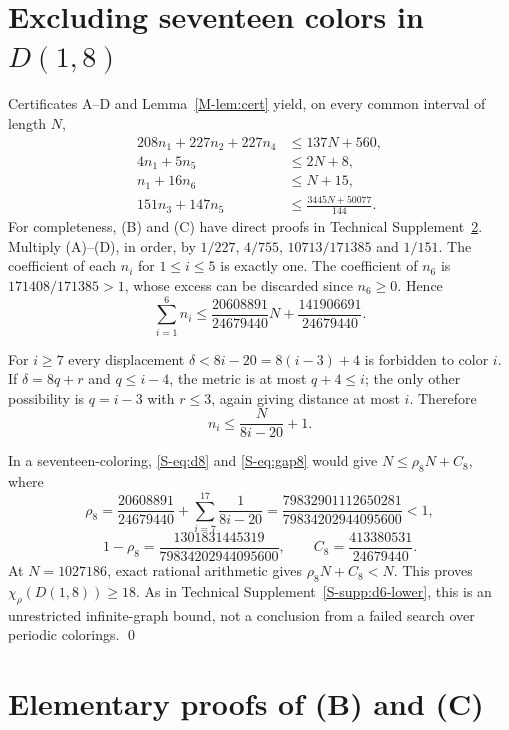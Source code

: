 \documentclass[11pt,reqno]{amsart}
\theoremstyle{plain}
\newcommand{\D}[1]{D(1,#1)}
\newcommand{\chirho}{\chi_{\rho}}
\theoremstyle{plain}
\theoremstyle{plain}
\begin{document}
\section{Excluding seventeen colors in \texorpdfstring{$\D{8}$}{D(1,8)}}\label{S-supp:d8-lower}

Certificates A--D and Lemma~\ref*{M-lem:cert} yield, on every common interval of
length $N$,
\begin{align}
208 n_1 + 227 n_2 + 227 n_4 &\le 137 N + 560, \tag{A}\\
4 n_1 + 5 n_5 &\le 2N + 8, \tag{B}\\
n_1 + 16 n_6 &\le N + 15, \tag{C}\\
151 n_3 + 147 n_5 &\le \tfrac{3445 N + 50077}{144}. \tag{D}
\end{align}
For completeness, (B) and (C) have direct proofs in Technical Supplement~\ref{S-supp:elementary}. Multiply
(A)--(D), in order, by $1/227$, $4/755$, $10713/171385$ and $1/151$. The
coefficient of each $n_i$ for $1 \le i \le 5$ is exactly one. The coefficient
of $n_6$ is $171408/171385 > 1$, whose excess can be discarded since
$n_6 \ge 0$. Hence
\begin{equation}\label{S-eq:d8}
\sum_{i=1}^{6} n_i \le \frac{20608891}{24679440} N
   + \frac{141906691}{24679440}.
\end{equation}

For $i \ge 7$ every displacement $\delta < 8i-20 = 8(i-3)+4$ is forbidden to
color $i$. If $\delta = 8q+r$ and $q \le i-4$, the metric is at most
$q + 4 \le i$; the only other possibility is $q = i-3$ with $r \le 3$, again
giving distance at most $i$. Therefore
\begin{equation}\label{S-eq:gap8}
n_i \le \frac{N}{8i-20} + 1 .
\end{equation}

In a seventeen-coloring, \eqref{S-eq:d8} and \eqref{S-eq:gap8} would give
$N \le \rho_8 N + C_8$, where
\[
\rho_8 = \frac{20608891}{24679440} + \sum_{i=7}^{17} \frac{1}{8i-20}
       = \frac{79832901112650281}{79834202944095600} < 1,
\]
\[
1 - \rho_8 = \frac{1301831445319}{79834202944095600}, \qquad
C_8 = \frac{413380531}{24679440}.
\]
At $N = 1027186$, exact rational arithmetic gives $\rho_8 N + C_8 < N$. This
proves $\chirho(\D{8}) \ge 18$. As in Technical Supplement~\ref{S-supp:d6-lower}, this is an unrestricted
infinite-graph bound, not a conclusion from a failed search over periodic
colorings. \qed


\section{Elementary proofs of (B) and (C)}\label{S-supp:elementary}
\end{document}
